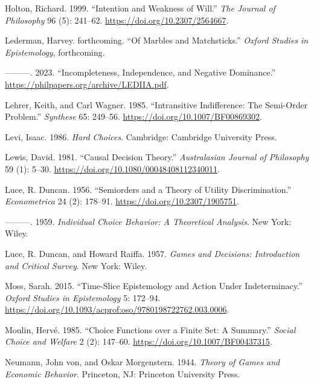 \documentclass[
  10.5pt,
  twoside]{article}
\newlength{\cslhangindent}
\newenvironment{CSLReferences}[2] %
 {\begin{list}{}{%
  \setlength{\itemindent}{0pt}
  \setlength{\leftmargin}{0pt}
  \setlength{\parsep}{0pt}
  \ifodd #1
   \setlength{\leftmargin}{\cslhangindent}
   \setlength{\itemindent}{-1\cslhangindent}
  \fi
  \setlength{\itemsep}{#2\baselineskip}}}
 {\end{list}}
\begin{document}
\begin{CSLReferences}{1}{0}
Holton, Richard. 1999. {``Intention and Weakness of Will.''} \emph{The
Journal of Philosophy} 96 (5): 241--62.
\url{https://doi.org/10.2307/2564667}.

Lederman, Harvey. forthcoming. {``Of Marbles and Matchsticks.''}
\emph{Oxford Studies in Epistemology}, forthcoming.

---------. 2023. {``Incompleteness, Independence, and Negative
Dominance.''} \url{https://philpapers.org/archive/LEDIIA.pdf}.

Lehrer, Keith, and Carl Wagner. 1985. {``Intransitive Indifference: The
Semi-Order Problem.''} \emph{Synthese} 65: 249--56.
\url{https://doi.org/10.1007/BF00869302}.

Levi, Isaac. 1986. \emph{Hard Choices}. Cambridge: Cambridge University
Press.

Lewis, David. 1981. {``Causal Decision Theory.''} \emph{Australasian
Journal of Philosophy} 59 (1): 5--30.
\url{https://doi.org/10.1080/00048408112340011}.

Luce, R. Duncan. 1956. {``Semiorders and a Theory of Utility
Discrimination.''} \emph{Econometrica} 24 (2): 178--91.
\url{https://doi.org/10.2307/1905751}.

---------. 1959. \emph{Individual Choice Behavior: A Theoretical
Analysis}. New York: Wiley.

Luce, R. Duncan, and Howard Raiffa. 1957. \emph{Games and Decisions:
Introduction and Critical Survey}. New York: Wiley.

Moss, Sarah. 2015. {``Time-Slice Epistemology and Action Under
Indeterminacy.''} \emph{Oxford Studies in Epistemology} 5: 172--94.
\url{https://doi.org/10.1093/acprof:oso/9780198722762.003.0006}.

Moulin, Hervé. 1985. {``Choice Functions over a Finite Set: A
Summary.''} \emph{Social Choice and Welfare} 2 (2): 147--60.
\url{https://doi.org/10.1007/BF00437315}.

Neumann, John von, and Oskar Morgenstern. 1944. \emph{Theory of Games
and Economic Behavior}. Princeton, NJ: Princeton University Press.


\end{CSLReferences}
\end{document}
